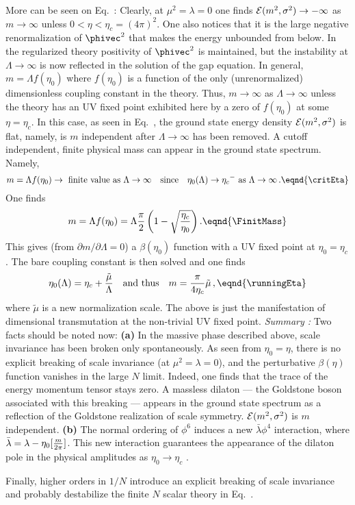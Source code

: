 More can be seen on Eq.~\GrStatEnergy:   Clearly, at $\mu^2=\lambda=0$ one
finds ${\cal E }(m^2,{\sigma}^2) \rightarrow - \infty $ as $m
\rightarrow \infty$ unless $0<\eta<\eta_c= (4\pi)^2 $. One also
notices that it is the large negative renormalization of
$\phivec^2$ that makes the energy unbounded from below. In the
regularized theory positivity of $\phivec^2$ is maintained, but
the instability at $ \Lambda \rightarrow \infty $ is now reflected
in the solution of the gap equation. In general, $ m=\Lambda
f(\eta_0)$ where $f(\eta_0)$ is a function of the only
(unrenormalized) dimensionless coupling constant in the theory.
Thus, $m \rightarrow \infty$ as $\Lambda \rightarrow \infty$ {
unless} the theory has an UV fixed point exhibited here by a zero
of $f(\eta_0)$ at some $\eta=\eta_c$. In this case, as seen in
Eq.~\GrStatEnergy, the ground state energy density ${\cal
E}(m^2,{\sigma}^2)$ is flat, namely, is  $m$ independent  after
$\Lambda \to \infty $ has been removed. A cutoff independent,
finite physical mass can appear in the ground state spectrum.
Namely,
$$ m=\Lambda f(\eta_0) \rightarrow
{\rm ~finite~ value ~as~} \Lambda \rightarrow \infty
 \quad {\rm since }\quad \eta_0(\Lambda) \to {\eta_c}^- {\rm ~as~}
\Lambda \to \infty \,. \eqnd{\critEta} $$
One finds
$$ m=\Lambda f(\eta_0) = \Lambda {\pi \over 2}
\left( 1-\sqrt{{\eta_c \over \eta_0} }\right) .
\eqnd{\FinitMass}$$
This gives (from $\partial m/ \partial \Lambda=0 $) a
$\beta(\eta_0)$ function with a UV fixed point at
$\eta_0=\eta_c$. The bare coupling constant is then solved and
one finds
$$ \eta_0(\Lambda)=\eta_c +{\tilde \mu \over \Lambda}\quad
{\rm  and~ thus }\quad m={\pi \over 4 \eta_c}\tilde \mu\, ,
\eqnd{\runningEta} $$ where $\tilde \mu $ is a new normalization
scale. The above is just the manifestation of dimensional
transmutation at the non-trivial UV fixed point.
\smallskip
 {\it Summary :} Two facts should be
noted now:  {\bf (a)} In the massive phase described above, scale
invariance has been broken only spontaneously. As seen from
$\eta_0=\eta$, there is no explicit breaking of scale invariance
(at $\mu^2=\lambda=0$), and the perturbative $\beta (\eta)$
function vanishes in the large $N$ limit. Indeed, one finds that
the trace of the energy momentum tensor stays zero. A massless
dilaton --- the Goldstone boson associated with this breaking ---
appears in the ground state spectrum as a reflection of the
Goldstone realization of scale symmetry. ${\cal
E}(m^2,{\sigma}^2)$ is $m$ independent. {\bf (b) } The normal
ordering of $\phi^6$ induces a new $\bar\lambda \phi^4$
interaction, where $\bar \lambda=\lambda-\eta_0 [{m \over 2\pi}]$.
This new interaction guarantees the appearance of the dilaton pole
in the physical amplitudes as $\eta_0 \to \eta_c$ .

Finally, higher orders in $1/N$ introduce an explicit breaking of scale invariance and probably destabilize the finite $N$ scalar theory
in Eq.~\PhiSixAction.


\vfill\eject
